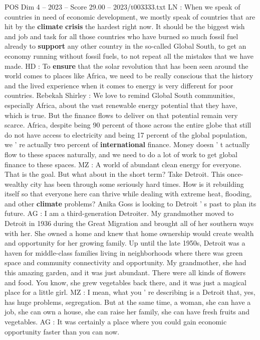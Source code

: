 \begin{textsample}{POS Dim 4 – 2023 – Score 29.00 – 2023/t003333.txt}
LN : When we speak of countries in need of economic development, we mostly speak of countries that are hit by the \textbf{climate} \textbf{crisis} the hardest right now.
It should be the biggest wish and job and task for all those countries who have burned so much fossil fuel already to \textbf{support} any other country in the so-called Global South, to get an economy running without fossil fuels, to not repeat all the mistakes that we have made.
HD : To \textbf{ensure} that the solar revolution that has been seen around the world comes to places like Africa, we need to be really conscious that the history and the lived experience when it comes to energy is very different for poor countries.
Rebekah Shirley : We love to remind Global South communities, especially Africa, about the vast renewable energy potential that they have, which is true.
But the finance flows to deliver on that potential remain very scarce.
Africa, despite being 90 percent of those across the entire globe that still do not have access to electricity and being 17 percent of the global population, we ' re actually two percent of \textbf{international} finance.
Money doesn ' t actually flow to these spaces naturally, and we need to do a lot of work to get global finance to these spaces.
MZ : A world of abundant clean energy for everyone.
That is the goal.
But what about in the short term?
Take Detroit.
This once-wealthy city has been through some seriously hard times.
How is it rebuilding itself so that everyone here can thrive while dealing with extreme heat, flooding, and other \textbf{climate} problems?
Anika Goss is looking to Detroit ' s past to plan its future.
AG : I am a third-generation Detroiter.
My grandmother moved to Detroit in 1936 during the Great Migration and brought all of her southern ways with her.
She owned a home and knew that home ownership would create wealth and opportunity for her growing family.
Up until the late 1950s, Detroit was a haven for middle-class families living in neighborhoods where there was green space and community connectivity and opportunity.
My grandmother, she had this amazing garden, and it was just abundant.
There were all kinds of flowers and food.
You know, she grew vegetables back there, and it was just a magical place for a little girl.
MZ : I mean, what you ' re describing is a Detroit that, yes, has huge problems, segregation.
But at the same time, a woman, she can have a job, she can own a house, she can raise her family, she can have fresh fruits and vegetables.
AG : It was certainly a place where you could gain economic opportunity faster than you can now.

\end{textsample}
